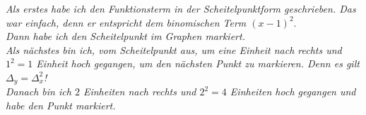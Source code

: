 \documentclass{article}
\begin{document}
\begin{minipage}[t]{.45\textwidth}
\normalfont
\raggedright
\vspace{0.5cm}
\emph{Als erstes habe ich den Funktionsterm in der Scheitelpunktform geschrieben. Das war einfach, denn er entspricht dem binomischen Term $(x-1)^2.$}\\[1cm]%

\emph{\color{orange!80!black}Dann habe ich den Scheitelpunkt im Graphen markiert.}\\[5cm]

\emph{\color{blue!80!black} Als nächstes bin ich, vom Scheitelpunkt aus, um eine Einheit nach rechts und $1^2 = 1$ Einheit hoch gegangen, um den nächsten Punkt zu markieren. Denn es gilt $\Delta_y = \Delta_x^2$!}\\[5.5cm]

\emph{\color{green!50!black} Danach bin ich $2$ Einheiten nach rechts und $2^2 = 4$ Einheiten hoch gegangen und habe den Punkt markiert.}\\[2.5cm]




\end{minipage}%
\begin{minipage}[t]{.05\textwidth}
\hfill\\
\end{minipage}%
\end{document}
